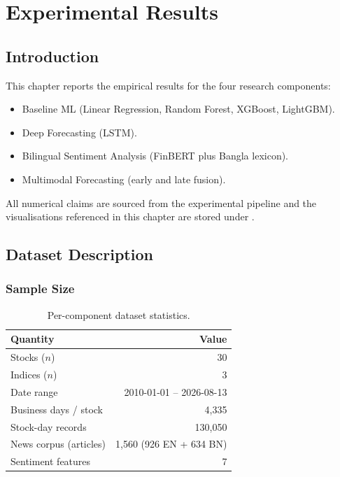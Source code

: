 \documentclass[12pt,a4paper,oneside]{report}
\begin{document}
\chapter{Experimental Results}
\label{ch:results}

\section{Introduction}

This chapter reports the empirical results for the four research
components:
\begin{itemize}[leftmargin=*,itemsep=2pt]
  \item Baseline \ac{ML} (Linear Regression, Random Forest,
        XGBoost, LightGBM).
  \item Deep Forecasting (\ac{LSTM}).
  \item Bilingual Sentiment Analysis (FinBERT plus Bangla lexicon).
  \item Multimodal Forecasting (early and late fusion).
\end{itemize}

All numerical claims are sourced from the experimental pipeline and
the visualisations referenced in this chapter are stored under
.

\section{Dataset Description}

\subsection{Sample Size}

\begin{table}[H]
  \centering
  \caption{Per-component dataset statistics.}
  \label{tab:dataset}
  \begin{tabular}{lr}
    \toprule
    Quantity & Value \\
    \midrule
    Stocks ($n$)            & 30 \\
    Indices ($n$)           & 3 \\
    Date range              & 2010-01-01 -- 2026-08-13 \\
    Business days / stock   & 4{,}335 \\
    Stock-day records       & 130{,}050 \\
    News corpus (articles)  & 1{,}560 (926 EN + 634 BN) \\
    Sentiment features      & 7 \\
    \bottomrule
  \end{tabular}
\end{table}
\end{document}
